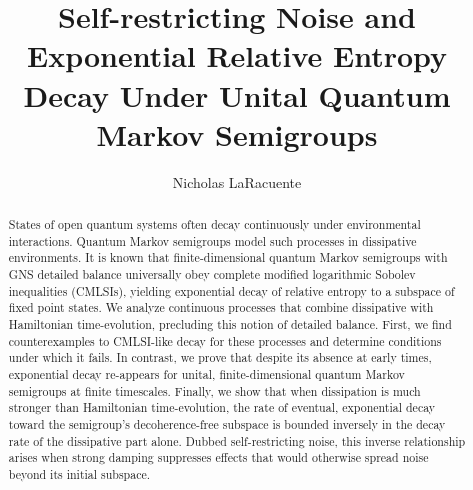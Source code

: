 \documentclass[accepted=2026-02-01, letterpaper]{quantumarticle}
\begin{document}
\title[Self-Restricting Noise and Entropy Decay]{Self-restricting Noise and Exponential Relative Entropy Decay Under Unital Quantum Markov Semigroups}

\author[N. LaRacuente]{Nicholas LaRacuente}




 \maketitle
 
\begin{abstract}
States of open quantum systems often decay continuously under environmental interactions. Quantum Markov semigroups model such processes in dissipative environments. It is known that finite-dimensional quantum Markov semigroups with GNS detailed balance universally obey complete modified logarithmic Sobolev inequalities (CMLSIs), yielding exponential decay of relative entropy to a subspace of fixed point states. We analyze continuous processes that combine dissipative with Hamiltonian time-evolution, precluding this notion of detailed balance. First, we find counterexamples to CMLSI-like decay for these processes and determine conditions under which it fails. In contrast, we prove that despite its absence at early times, exponential decay re-appears for unital, finite-dimensional quantum Markov semigroups at finite timescales. Finally, we show that when dissipation is much stronger than Hamiltonian time-evolution, the rate of eventual, exponential decay toward the semigroup's decoherence-free subspace is bounded inversely in the decay rate of the dissipative part alone. Dubbed self-restricting noise, this inverse relationship arises when strong damping suppresses effects that would otherwise spread noise beyond its initial subspace.
\end{abstract}


\end{document}
